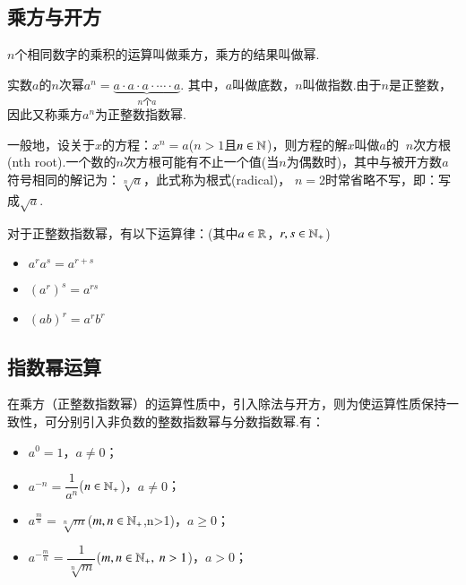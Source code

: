   \subsection{乘方与开方}
    \begin{description}[leftmargin=0pt]
      \item [乘方] $n$个相同数字的乘积的运算叫做{\fangsong 乘方}，乘方的结果叫做{\fangsong 幂}. \par
        实数$a$的$n$次幂$a^n=\underbrace{{a\cdot a\cdot a\cdot \cdots \cdot a}}_{n\text{个}a}$.
        其中，$a$叫做{\fangsong 底数}，$n$叫做{\fangsong 指数}.由于$n$是正整数，因此又称乘方$a^n$为{\fangsong 正整数指数幂}.
      \\
      \item [$n$次方根与根式]
        一般地，设关于$x$的方程：$x^n=a$($n>1$且$n\in\mathbb{N}$)，则方程的解$x$叫做$a$的 {\fangsong $~n$次方根}(nth root).一个数的$n$次方根可能有不止一个值(当$n$为偶数时)，其中与{\fangsong 被开方数}$a$符号相同的解记为：$\sqrt[n]a$，此式称为{\fangsong 根式}(radical)，
        $n=2$时常省略不写，即：写成$\sqrt a$.
        \\
      \item [运算性质]对于正整数指数幂，有以下运算律：(其中$a\in\mathbb{R}$，$r,s\in\mathbb{N}_+$)
        \begin{itemize}%
          \item $a^ra^s=a^{r+s}$
          \item $(a^r)^s=a^{rs}$
          \item $(ab)^r=a^rb^r$
        \end{itemize}
    \end{description}
  \subsection{指数幂运算}
    在乘方（正整数指数幂）的运算性质中，引入除法与开方，则为使运算性质保持一致性，可分别引入非负数的整数指数幂与分数指数幂.有：
    \begin{itemize}
      \item $a^0=1$，$a\neq 0$；
      \item $a^{-n}=\dfrac1{a^n}$($n\in\mathbb{N}_+$)，$a\neq 0$；
      \item $a^{\frac{m}{n}}=\sqrt[n]m$($m,n\in\mathbb{N}_+$,n>1)，$a\geqslant 0$；
      \item $a^{-\frac{m}{n}}=\dfrac{1}{\sqrt[n]m}$($m,n\in\mathbb{N}_+,~n>1$)，$a>0$；
    \end{itemize}
